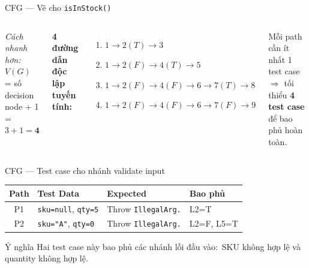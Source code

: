 \documentclass[aspectratio=169,12pt]{beamer}
\begin{document}
\begin{frame}[fragile,shrink=18]{CFG --- Vẽ cho \texttt{isInStock()}}
\begin{columns}
    \vspace{0.3em}
    \textit{Cách nhanh hơn:} $V(G)$ = số decision node + 1 = $3 + 1 = \mathbf{4}$

    \vspace{0.5em}
    \textbf{4 đường dẫn độc lập tuyến tính:}
    \begin{enumerate}
      \item $1 \to 2(T) \to 3$
      \item $1 \to 2(F) \to 4(T) \to 5$
      \item $1 \to 2(F) \to 4(F) \to 6 \to 7(T) \to 8$
      \item $1 \to 2(F) \to 4(F) \to 6 \to 7(F) \to 9$
    \end{enumerate}

    \vspace{0.3em}
    Mỗi path cần ít nhất 1 test case $\Rightarrow$
    tối thiểu \textbf{4 test case} để bao phủ hoàn toàn.
  \end{columns}
\end{frame}

\begin{frame}{CFG --- Test case cho nhánh validate input}
  \large
  \renewcommand{\arraystretch}{1.35}
  \begin{tabularx}{\textwidth}{cXll}
    \toprule
    \textbf{Path} & \textbf{Test Data} & \textbf{Expected} & \textbf{Bao phủ} \\
    \midrule
    P1 & \texttt{sku=null}, \texttt{qty=5} & Throw \texttt{IllegalArg.} & L2=T \\
    P2 & \texttt{sku="A"}, \texttt{qty=0} & Throw \texttt{IllegalArg.} & L2=F, L5=T \\
    \bottomrule
  \end{tabularx}
  \renewcommand{\arraystretch}{1}

  \vspace{0.5em}
  \begin{block}{Ý nghĩa}
    Hai test case này bao phủ các nhánh lỗi đầu vào:\
    SKU không hợp lệ và quantity không hợp lệ.
  \end{block}
\end{frame}
\end{document}
